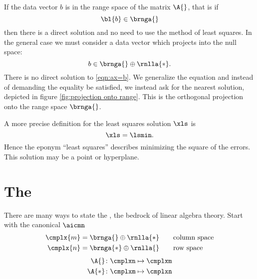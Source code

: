If the data vector $b$ is in the range space of the matrix $\A{}$, that is if
  \begin{equation*}
    \bl{b} \in \brnga{}
  \end{equation*}
then there is a direct solution and no need to use the method of least squares. In the general case we must consider a data vector which projects into the null space:
  \begin{equation*}
    b \in \brnga{} \oplus \rnlla{*} .
  \end{equation*}
There is no direct solution to \eqref{eqn:ax=b}. We generalize the equation and instead of demanding the equality be satisfied, we instead ask for the nearest solution, depicted in figure \eqref{fig:projection onto range}. This is the orthogonal projection onto the range space $\brnga{}$.

A more precise definition for the least squares solution $\xls$ is
  \begin{equation}
    \xls = \lsmin .
    \label{eqn:definition}
  \end{equation}
Hence the eponym ``least squares'' describes minimizing the square of the errors. This solution may be a point or hyperplane.


\section[The \ft]{The \ftola}  %
There are many ways to state the \ftola, the bedrock of linear algebra theory. Start with the canonical $\aicmn$
  \begin{equation}
  \begin{split}
    \cmplx{m} &=\brnga{}\oplus\rnlla{*} \qquad \text{column space} \\
    \cmplx{n} &=\brnga{*}\oplus\rnlla{} \qquad \text{row space} \\
    \label{eqn:ftola}
  \end{split}
  \end{equation}
  \begin{equation}
    \begin{split}
      \A{}  &\colon \cmplxn \mapsto \cmplxm \\
      \A{*} &\colon \cmplxm \mapsto \cmplxn 
    \end{split}
  \end{equation}

